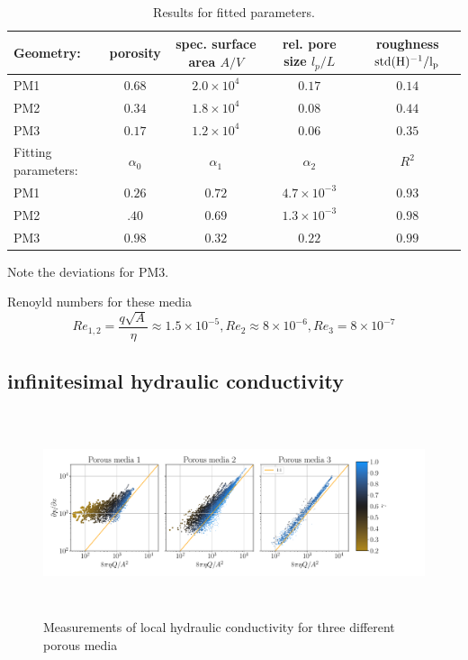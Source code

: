 \documentclass[draft]{agujournal2019}
\begin{document}
\begin{table}[htbp!]
\centering
\begin{tabular}{l|c|c|c|c}
Geometry: & porosity & spec. surface area $A/V$ &rel. pore size $ l_p/L$ & roughness $\rm{std}(H)^{-1}/l_p$ \\
\hline
PM1 & $0.68$ & $2.0\times10^{4}$ & $0.17$ &  $0.14$\\
PM2 & $0.34$ & $1.8\times10^{4}$ & $0.08$ &  $0.44$\\
PM3 & $0.17$ & $1.2\times10^{4}$ & $0.06$ &  $0.35$\\
\hline
Fitting parameters: & $\alpha_0$ & $\alpha_1$ & $\alpha_2$ & $R^2$  \\
\hline
PM1 & $0.26$ & $0.72$ & $4.7\times 10^{-3}$ &  $0.93$\\
PM2 & $.40$ & $0.69$ & $1.3 \times 10^{-3}$ & $0.98$ \\
PM3 & $0.98$ & $0.32$ & $0.22$ & $0.99$ \\
\end{tabular}
\caption{\label{tab:table-name}Results for fitted parameters.}
\end{table}
Note the deviations for PM3.


Renoyld numbers for these media 
\begin{equation}
	Re_{1,2} = \frac{q \sqrt{A}}{\eta}\approx 1.5 \times 10^{-5}, Re_2 \approx 8 \times 10^{-6}, Re_3 = 8 \times 10^{-7}
\end{equation}

\subsection{infinitesimal hydraulic conductivity}

\begin{figure}\label{fig:local_and_integrated}
\includegraphics[height=6cm]{figures/infi_dpdx_3.pdf}
\caption{Measurements of local hydraulic conductivity for three different porous media}
\end{figure}
\end{document}
